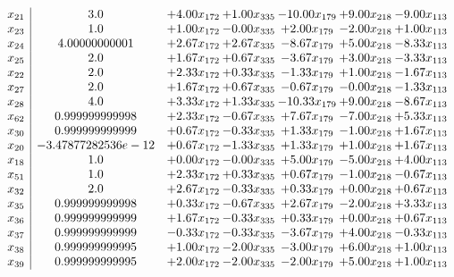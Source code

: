 \documentclass[8pt]{article}
\begin{document}
\[\begin{array}{c| c c@{\hskip 2pt} c@{\hskip 2pt} c@{\hskip 2pt} c@{\hskip 2pt} c@{\hskip 2pt} }
 x_{21}   &  3.0 & +  4.00 x_{172} & +  1.00 x_{335} & -10.00 x_{179} & +  9.00 x_{218} & -9.00 x_{113}\\
 x_{23}   &  1.0 & +  1.00 x_{172} & -0.00 x_{335} & +  2.00 x_{179} & -2.00 x_{218} & +  1.00 x_{113}\\
 x_{24}   &  4.00000000001 & +  2.67 x_{172} & +  2.67 x_{335} & -8.67 x_{179} & +  5.00 x_{218} & -8.33 x_{113}\\
 x_{25}   &  2.0 & +  1.67 x_{172} & +  0.67 x_{335} & -3.67 x_{179} & +  3.00 x_{218} & -3.33 x_{113}\\
 x_{22}   &  2.0 & +  2.33 x_{172} & +  0.33 x_{335} & -1.33 x_{179} & +  1.00 x_{218} & -1.67 x_{113}\\
 x_{27}   &  2.0 & +  1.67 x_{172} & +  0.67 x_{335} & -0.67 x_{179} & -0.00 x_{218} & -1.33 x_{113}\\
 x_{28}   &  4.0 & +  3.33 x_{172} & +  1.33 x_{335} & -10.33 x_{179} & +  9.00 x_{218} & -8.67 x_{113}\\
 x_{62}   &  0.999999999998 & +  2.33 x_{172} & -0.67 x_{335} & +  7.67 x_{179} & -7.00 x_{218} & +  5.33 x_{113}\\
 x_{30}   &  0.999999999999 & +  0.67 x_{172} & -0.33 x_{335} & +  1.33 x_{179} & -1.00 x_{218} & +  1.67 x_{113}\\
 x_{20}   &  -3.47877282536e-12 & +  0.67 x_{172} & -1.33 x_{335} & +  1.33 x_{179} & +  1.00 x_{218} & +  1.67 x_{113}\\
 x_{18}   &  1.0 & +  0.00 x_{172} & -0.00 x_{335} & +  5.00 x_{179} & -5.00 x_{218} & +  4.00 x_{113}\\
 x_{51}   &  1.0 & +  2.33 x_{172} & +  0.33 x_{335} & +  0.67 x_{179} & -1.00 x_{218} & -0.67 x_{113}\\
 x_{32}   &  2.0 & +  2.67 x_{172} & -0.33 x_{335} & +  0.33 x_{179} & +  0.00 x_{218} & +  0.67 x_{113}\\
 x_{35}   &  0.999999999998 & +  0.33 x_{172} & -0.67 x_{335} & +  2.67 x_{179} & -2.00 x_{218} & +  3.33 x_{113}\\
 x_{36}   &  0.999999999999 & +  1.67 x_{172} & -0.33 x_{335} & +  0.33 x_{179} & +  0.00 x_{218} & +  0.67 x_{113}\\
 x_{37}   &  0.999999999999 & -0.33 x_{172} & -0.33 x_{335} & -3.67 x_{179} & +  4.00 x_{218} & -0.33 x_{113}\\
 x_{38}   &  0.999999999995 & +  1.00 x_{172} & -2.00 x_{335} & -3.00 x_{179} & +  6.00 x_{218} & +  1.00 x_{113}\\
 x_{39}   &  0.999999999995 & +  2.00 x_{172} & -2.00 x_{335} & -2.00 x_{179} & +  5.00 x_{218} & +  1.00 x_{113}\\

\end{array}\]
\end{document}
